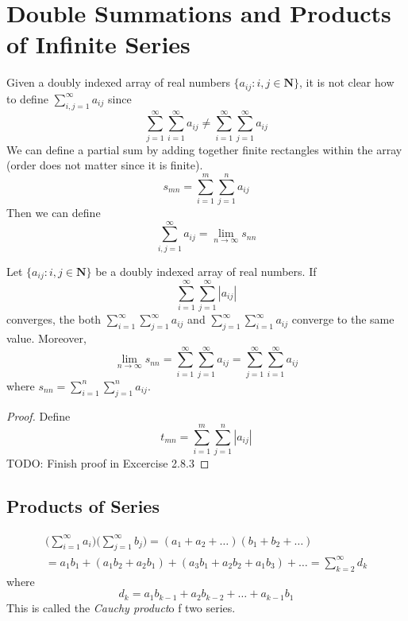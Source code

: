 \section{Double Summations and Products of Infinite Series}
    Given a doubly indexed array of real numbers $\{a_{ij}: i,j \in \textbf{N}\}$, it is not clear how to define $\sum_{i,j=1}^\infty a_{ij}$ since
    $$\sum_{j=1}^\infty\sum_{i=1}^\infty a_{ij} \neq \sum_{i=1}^\infty\sum_{j=1}^\infty a_{ij}$$
    We can define a partial sum by adding together finite rectangles within the array (order does not matter since it is finite).
    $$s_{mn} = \sum_{i=1}^m\sum_{j=1}^n a_{ij}$$
    Then we can define
    $$\sum_{i,j=1}^\infty a_{ij} = \lim_{n\rightarrow\infty} s_{nn}$$
    \begin{theorem}
        Let $\{a_{ij}: i,j \in \textbf{N}\}$ be a doubly indexed array of real numbers. If
        $$\sum_{i=1}^\infty\sum_{j=1}^\infty |a_{ij}|$$
        converges, the both $\sum_{i=1}^\infty\sum_{j=1}^\infty a_{ij}$ and $\sum_{j=1}^\infty\sum_{i=1}^\infty a_{ij}$ converge to the same value. Moreover,
        $$\lim_{n\rightarrow\infty} s_{nn} = \sum_{i=1}^\infty\sum_{j=1}^\infty a_{ij} = \sum_{j=1}^\infty\sum_{i=1}^\infty a_{ij}$$
        where $s_{nn} = \sum_{i=1}^n\sum_{j=1}^n a_{ij}$.
    \end{theorem}
    \begin{proof}
        Define
        $$t_{mn} = \sum_{i=1}^m\sum_{j=1}^n |a_{ij}|$$
        TODO: Finish proof in Excercise 2.8.3
    \end{proof}
    \subsection*{Products of Series}
        \begin{align*}
            \big(\sum_{i=1}^\infty a_i \big)\big(\sum_{j=1}^\infty b_j \big) = (a_1 + a_2 + \dots)(b_1 + b_2 + \dots) \\
            = a_1b_1 + (a_1b_2 + a_2b_1) + (a_3b_1 + a_2b_2 + a_1b_3) + \dots
            = \sum_{k=2}^\infty d_k
        \end{align*}
        where
        $$d_k = a_1b_{k-1} + a_2b_{k-2} + \dots + a_{k-1}b_1$$
        This is called the \textit{Cauchy product}o f two series.